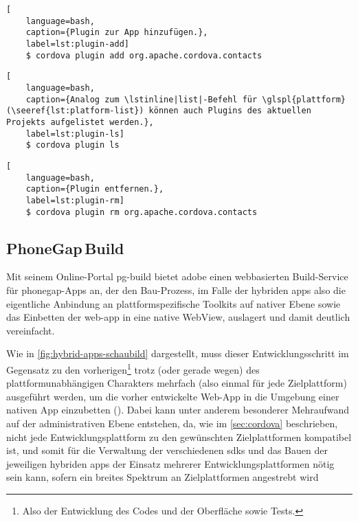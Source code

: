 {\begin{minipage}{\linewidth}
\begin{lstlisting}[
	language=bash,
	caption={Plugin zur App hinzufügen.},
	label=lst:plugin-add]
	$ cordova plugin add org.apache.cordova.contacts
\end{lstlisting}

\begin{lstlisting}[
	language=bash,
	caption={Analog zum \lstinline|list|-Befehl für \glspl{plattform} (\seeref{lst:platform-list}) können auch Plugins des aktuellen Projekts aufgelistet werden.},
	label=lst:plugin-ls]
	$ cordova plugin ls
\end{lstlisting}

\begin{lstlisting}[
	language=bash,
	caption={Plugin entfernen.},
	label=lst:plugin-rm]
	$ cordova plugin rm org.apache.cordova.contacts
\end{lstlisting}
\end{minipage}\par\addvspace{\topskip}

\subsection{PhoneGap\,Build}

Mit seinem Online-Portal \gls{pg-build} bietet \gls{adobe} einen webbasierten Build-Service für \gls{phonegap}-Apps an, der den Bau-Prozess, im Falle der hybriden \glspl{app} also die eigentliche Anbindung an plattformspezifische Toolkits auf nativer Ebene sowie das Einbetten der \gls{web-app} in eine native WebView, auslagert und damit deutlich vereinfacht.

Wie in \autoref{fig:hybrid-apps-schaubild} dargestellt, muss dieser Entwicklungsschritt im Gegensatz zu den vorherigen\footnote{Also der Entwicklung des Codes und der Oberfläche sowie Tests.} trotz (oder gerade wegen) des plattformunabhängigen Charakters mehrfach (also einmal für jede Zielplattform) ausgeführt werden, um die vorher entwickelte Web-App in die Umgebung einer nativen App einzubetten ().
Dabei kann unter anderem besonderer Mehraufwand auf der administrativen Ebene entstehen, da, wie im \autoref{sec:cordova} beschrieben, nicht jede Entwicklungsplattform zu den gewünschten Zielplattformen kompatibel ist, und somit für die Verwaltung der verschiedenen \glspl{sdk} und das Bauen der jeweiligen hybriden \glspl{app} der Einsatz mehrerer Entwicklungsplattformen nötig sein kann, sofern ein breites Spektrum an Zielplattformen angestrebt wird

}
